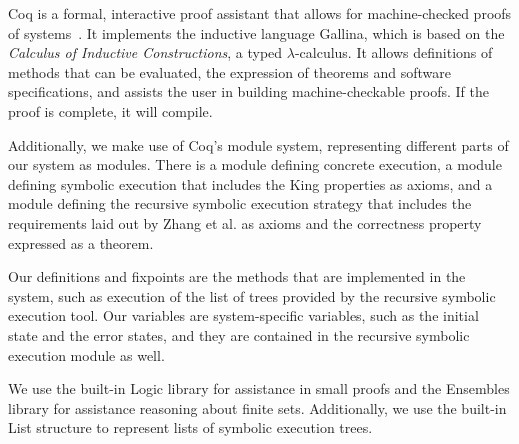 Coq is a formal, interactive proof assistant that allows for machine-checked proofs of systems~\cite{coqtool}. 
It implements the inductive language Gallina, which is based on the \textit{Calculus of Inductive Constructions}, a typed $\lambda$-calculus. It allows definitions of methods that can be evaluated, the expression of theorems and software specifications, and assists the user in building machine-checkable proofs. If the proof is complete, it will compile.



 

Additionally, we make use of Coq's module system, representing different parts of our system as modules.  There is a module defining concrete execution, a module defining symbolic execution that includes the King properties as axioms, and a module defining the recursive symbolic execution strategy that includes the requirements laid out by Zhang et al. as axioms and the correctness property expressed as a theorem.

Our definitions and fixpoints are the methods that are implemented
in the system, such as execution of the list of trees provided by the recursive
symbolic execution tool. Our variables are system-specific variables, such as the
initial state and the error states, and they are contained in the recursive symbolic execution module as well.

We use the built-in Logic library for assistance in small proofs and the Ensembles library for assistance reasoning about finite sets. Additionally, we use the built-in List structure to represent lists of symbolic execution trees.









